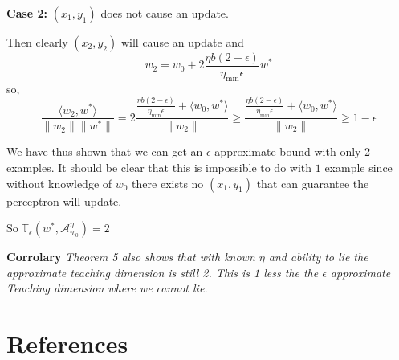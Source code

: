 \documentclass{article}
\newcommand{\learn}{\mathcal{A}_{w_0}^\eta}
\begin{document}
\textbf{Case 2:} $(x_1, y_1)$ does not cause an update.

Then clearly $(x_2, y_2)$ will cause an update and
$$
w_2 = w_0 + 2\frac{\eta b(2-\epsilon)}{\eta_{\min} \epsilon}w^* 
$$
so,
$$
\frac{\langle w_2 , w^* \rangle}{\lVert w_2 \rVert \lVert w^* \rVert} = 2\frac{\frac{\eta b(2-\epsilon)}{\eta_{\min} \epsilon} + \langle w_0, w^* \rangle}{\lVert w_2 \rVert} \geq \frac{\frac{\eta b(2-\epsilon)}{\eta_{\min} \epsilon} + \langle w_0, w^* \rangle}{\lVert w_2 \rVert} \geq 1 - \epsilon
$$

We have thus shown that we can get an $\epsilon$ approximate bound with only 2 examples. It should be clear that this is impossible to do with $1$ example since without knowledge of $w_0$ there exists no $(x_1, y_1)$ that can guarantee the perceptron will update.

So 
$
\mathbb{T}_{\epsilon}(w^*, \learn) = 2
$

\textbf{Corrolary}
\textit{
Theorem 5 also shows that with known $\eta$ and ability to lie the approximate teaching dimension is still 2. This is 1 less the the $\epsilon$ approximate Teaching dimension where we cannot lie. \cite{perceptron}
}

\section*{References}



\small


\end{document}
